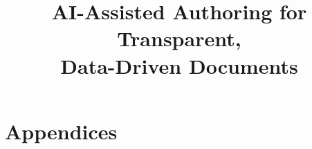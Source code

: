 \documentclass{article}
\begin{document}
\title{AI-Assisted Authoring for Transparent, \\Data-Driven Documents}

\maketitle







\clearpage


\appendix
\section*{Appendices}

\end{document}
